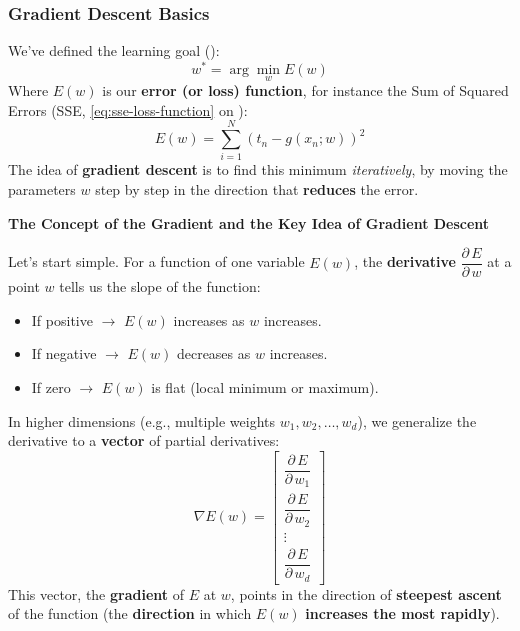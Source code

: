 \subsubsection{Gradient Descent Basics}\label{sec:gradient-descent-basics}

We've defined the learning goal ():
\begin{equation*}
    w^{*} = \arg\min_{w} E\left(w\right)
\end{equation*}
Where $E(w)$ is our \textbf{error (or loss) function}, for instance the Sum of Squared Errors (SSE, \autoref{eq:sse-loss-function} on ):
\begin{equation*}
    E(w) = \displaystyle\sum_{i=1}^{N} (t_{n} - g(x_{n}; w))^{2}
\end{equation*}
The idea of \textbf{gradient descent} is to find this minimum \emph{iteratively}, by moving the parameters $w$ step by step in the direction that \textbf{reduces} the error.

\highspace
\begin{flushleft}
    \textcolor{Green3}{ \textbf{The Concept of the Gradient and the Key Idea of Gradient Descent}}
\end{flushleft}
Let's start simple. For a function of one variable $E(w)$, the \textbf{derivative} $\dfrac{\partial \, E}{\partial \, w}$ at a point $w$ tells us the slope of the function:
\begin{itemize}
    \item If positive $\rightarrow$ $E(w)$ increases as $w$ increases.
    \item If negative $\rightarrow$ $E(w)$ decreases as $w$ increases.
    \item If zero $\rightarrow$ $E(w)$ is flat (local minimum or maximum).
\end{itemize}
In higher dimensions (e.g., multiple weights $w_{1}, w_{2}, \ldots, w_{d}$), we generalize the derivative to a \textbf{vector} of partial derivatives:
\begin{equation*}
    \nabla E(w) = \begin{bmatrix}
        \dfrac{\partial \, E}{\partial \, w_{1}} \\[1.2em]
        \dfrac{\partial \, E}{\partial \, w_{2}} \\[1.2em]
        \vdots \\[1em]
        \dfrac{\partial \, E}{\partial \, w_{d}}
    \end{bmatrix}
\end{equation*}
This vector, the \textbf{gradient} of $E$ at $w$, points in the direction of \textbf{steepest ascent} of the function (the \textbf{direction} in which $E(w)$ \textbf{increases the most rapidly}).

